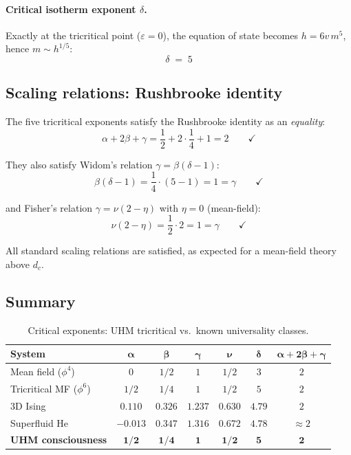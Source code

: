 \paragraph{Critical isotherm exponent $\delta$.}
Exactly at the tricritical point ($\varepsilon = 0$), the equation of state becomes
$h = 6 v\, m^5$, hence $m \sim h^{1/5}$:
\begin{equation}
  \boxed{\;\delta \;=\; 5\;}
  \label{eq:delta-derivation}
\end{equation}

\subsection{Scaling relations: Rushbrooke identity}

The five tricritical exponents satisfy the Rushbrooke identity as an \emph{equality}:
\begin{equation}
  \alpha + 2\beta + \gamma = \frac{1}{2} + 2 \cdot \frac{1}{4} + 1 = 2
  \qquad\checkmark
  \label{eq:rushbrooke}
\end{equation}

They also satisfy Widom's relation $\gamma = \beta(\delta - 1)$:
\begin{equation}
  \beta(\delta - 1) = \frac{1}{4} \cdot (5 - 1) = 1 = \gamma
  \qquad\checkmark
\end{equation}

and Fisher's relation $\gamma = \nu(2 - \eta)$ with $\eta = 0$ (mean-field):
\begin{equation}
  \nu(2 - \eta) = \frac{1}{2} \cdot 2 = 1 = \gamma
  \qquad\checkmark
\end{equation}

All standard scaling relations are satisfied, as expected for a mean-field theory above
$d_c$.

\subsection{Summary}

\begin{table}[H]
\centering
\caption{Critical exponents: UHM tricritical vs.\ known universality classes.}
\label{tab:exponents-comparison}
\begin{tabular}{@{}lcccccc@{}}
\toprule
\textbf{System} & $\boldsymbol{\alpha}$ & $\boldsymbol{\beta}$ & $\boldsymbol{\gamma}$ & $\boldsymbol{\nu}$ & $\boldsymbol{\delta}$ & $\boldsymbol{\alpha+2\beta+\gamma}$ \\
\midrule
Mean field ($\phi^4$) & $0$ & $1/2$ & $1$ & $1/2$ & $3$ & $2$ \\
Tricritical MF ($\phi^6$) & $1/2$ & $1/4$ & $1$ & $1/2$ & $5$ & $2$ \\
3D Ising & $0.110$ & $0.326$ & $1.237$ & $0.630$ & $4.79$ & $2$ \\
Superfluid He & $-0.013$ & $0.347$ & $1.316$ & $0.672$ & $4.78$ & $\approx 2$ \\
\textbf{UHM consciousness} & $\mathbf{1/2}$ & $\mathbf{1/4}$ & $\mathbf{1}$ & $\mathbf{1/2}$ & $\mathbf{5}$ & $\mathbf{2}$ \\
\bottomrule
\end{tabular}
\end{table}

